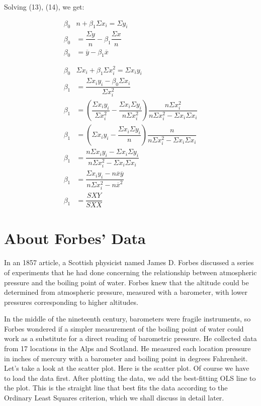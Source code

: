 \documentclass{article}
\begin{document}
    Solving (13), (14), we get:
    
    \begin{align} 
        \beta_{0} &n + \beta_{1} \Sigma x_{i} = \Sigma y_{i}                \nonumber \\
        \beta_{0} &= \dfrac {\Sigma y}{n} - \beta_{1}  \dfrac {\Sigma x}{n} \nonumber \\
        \beta_{0} &= \overline{y} - \beta_{1}  \overline{x}                 \\
        \nonumber \\
        \nonumber \\
        \beta_{0} &\Sigma x_{i} + \beta_{1} \Sigma x_{i}^2 = \Sigma x_{i} y_{i} \nonumber \\
        \beta_{1} &= \dfrac{\Sigma x_{i}y_{i} - \beta _{0} \Sigma x_{i} }{ \Sigma x_{i}^2} \nonumber \\
        \beta_{1} &= \left ( \dfrac{\Sigma x_{i}y_{i}}{\Sigma x_{i}^2} - \dfrac{\Sigma x_{i} \Sigma y_{i}}{n \Sigma x_{i}^2} \right ) 
        \dfrac{n \Sigma x_{i}^2}{n\Sigma x_{i}^2 - \Sigma x_{i} \Sigma x_{i}} \nonumber \\
        \beta_{1} &= \left ( \Sigma x_{i}y_{i} - \dfrac{\Sigma x_{i} \Sigma y_{i}}{n} \right ) 
        \dfrac{n}{n\Sigma x_{i}^2 - \Sigma x_{i} \Sigma x_{i}} \nonumber \\
        \beta_{1} &= \dfrac{n \Sigma x_{i} y_{i} - \Sigma x_{i} \Sigma y_{i}}{n \Sigma x_{i}^2 - \Sigma x_{i} \Sigma x_{i}} \nonumber \\
        \beta_{1} &= \dfrac{\Sigma x_{i} y_{i} - n \overline{x} \overline{y}}{n \Sigma x_{i}^2 - n \overline{x}^2} \nonumber \\
        \beta_{1} &= \dfrac{SXY}{SXX}
    \end{align}

\section {About Forbes' Data}
    
    In an 1857 article, a Scottish physicist named James D. Forbes discussed a series of experiments that he had done concerning the relationship between atmospheric pressure and the boiling point of water. Forbes knew that the altitude could be determined from atmospheric pressure, measured with a barometer, with lower pressures corresponding to higher altitudes.
    
    In the middle of the nineteenth century, barometers were fragile instruments, so Forbes wondered if a simpler measurement of the boiling point of water could work as a substitute for a direct reading of barometric pressure. He collected data from 17 locations in the Alps and Scotland. He measured each location pressure in inches of mercury with a barometer and boiling point in degrees Fahrenheit. Let’s take a look at the scatter plot. Here is the scatter plot.
    Of course we have to load the data first. After plotting the data, we add the best-fitting OLS line to the plot. This is the straight line that best fits the data according to the Ordinary Least Squares criterion, which we shall discuss in detail later.
    
\end{document}
